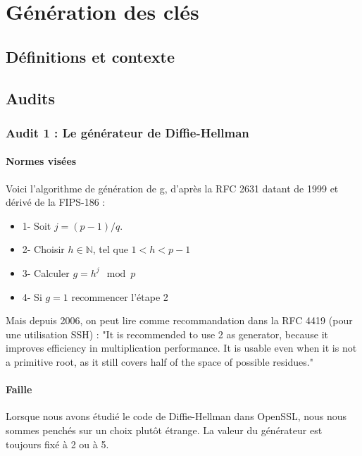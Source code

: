 \chapter{Génération des clés}
\section{Définitions et contexte}

\section{Audits}
	\subsection{Audit 1 : Le générateur de Diffie-Hellman}
		\subsubsection{Normes visées}

		Voici l'algorithme de génération de g, d'après la RFC 2631 \cite{rfc2631}
		datant de 1999 et dérivé de la FIPS-186 : 
		\begin{itemize}
		\item 1- Soit $j = (p - 1)/q$.
		\item 2- Choisir $h \in \mathbb{N}$, tel que $1 < h < p - 1$
		\item 3- Calculer $g = h^j \mod p$
		\item 4- Si $g = 1$ recommencer l'étape 2\\
		\end{itemize}
	
		Mais depuis 2006, on peut lire comme recommandation dans la RFC 4419 (pour 
		une utilisation SSH) : "It is recommended to use 2 as generator, because it improves
		efficiency in multiplication performance.  It is usable even when it
		is not a primitive root, as it still covers half of the space of
		possible residues."\\
	
		\subsubsection{Faille}
	
		Lorsque nous avons étudié le code de Diffie-Hellman dans OpenSSL, nous nous
		sommes penchés sur un choix plutôt étrange. La valeur du générateur est toujours fixé à 2 ou à 5. \\
	
